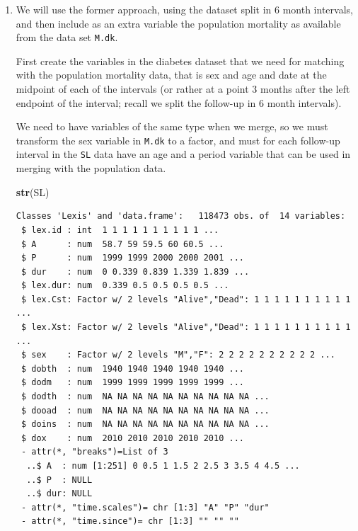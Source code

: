 \documentclass[
]{book}
\newenvironment{Shaded}{\begin{snugshade}}{\end{snugshade}}
\newcommand{\CommentTok}[1]{\textcolor[rgb]{0.56,0.35,0.01}{\textit{#1}}}
\newcommand{\FloatTok}[1]{\textcolor[rgb]{0.00,0.00,0.81}{#1}}
\newcommand{\FunctionTok}[1]{\textcolor[rgb]{0.13,0.29,0.53}{\textbf{#1}}}
\newcommand{\NormalTok}[1]{#1}
\newcommand{\OtherTok}[1]{\textcolor[rgb]{0.56,0.35,0.01}{#1}}
\newcommand{\SpecialCharTok}[1]{\textcolor[rgb]{0.81,0.36,0.00}{\textbf{#1}}}
\theoremstyle{definition}
\theoremstyle{definition}
\theoremstyle{definition}
\theoremstyle{definition}
\theoremstyle{remark}
\begin{document}
\begin{enumerate}
\def\labelenumi{\arabic{enumi}.}
\setcounter{enumi}{11}
\item
  We will use the former approach, using the dataset split in
  6 month intervals, and then include as an extra variable the
  population mortality as available from the data set \texttt{M.dk}.

  First create the variables in the diabetes dataset that we need
  for matching with the population mortality data, that is sex and
  age and date at the midpoint of each of the intervals (or rather at a
  point 3 months after the left endpoint of the interval; recall
  we split the follow-up in 6 month intervals).

  We need to have variables of the same type when we merge, so we must
  transform the sex variable in \texttt{M.dk} to a factor, and must
  for each follow-up interval in the \texttt{SL} data have an age and
  a period variable that can be used in merging with the population data.

\begin{Shaded}
\begin{Highlighting}[]
\FunctionTok{str}\NormalTok{(SL)}
\end{Highlighting}
\end{Shaded}

\begin{verbatim}
Classes 'Lexis' and 'data.frame':   118473 obs. of  14 variables:
 $ lex.id : int  1 1 1 1 1 1 1 1 1 1 ...
 $ A      : num  58.7 59 59.5 60 60.5 ...
 $ P      : num  1999 1999 2000 2000 2001 ...
 $ dur    : num  0 0.339 0.839 1.339 1.839 ...
 $ lex.dur: num  0.339 0.5 0.5 0.5 0.5 ...
 $ lex.Cst: Factor w/ 2 levels "Alive","Dead": 1 1 1 1 1 1 1 1 1 1 ...
 $ lex.Xst: Factor w/ 2 levels "Alive","Dead": 1 1 1 1 1 1 1 1 1 1 ...
 $ sex    : Factor w/ 2 levels "M","F": 2 2 2 2 2 2 2 2 2 2 ...
 $ dobth  : num  1940 1940 1940 1940 1940 ...
 $ dodm   : num  1999 1999 1999 1999 1999 ...
 $ dodth  : num  NA NA NA NA NA NA NA NA NA NA ...
 $ dooad  : num  NA NA NA NA NA NA NA NA NA NA ...
 $ doins  : num  NA NA NA NA NA NA NA NA NA NA ...
 $ dox    : num  2010 2010 2010 2010 2010 ...
 - attr(*, "breaks")=List of 3
  ..$ A  : num [1:251] 0 0.5 1 1.5 2 2.5 3 3.5 4 4.5 ...
  ..$ P  : NULL
  ..$ dur: NULL
 - attr(*, "time.scales")= chr [1:3] "A" "P" "dur"
 - attr(*, "time.since")= chr [1:3] "" "" ""
\end{verbatim}

\begin{Shaded}
\end{Shaded}


\end{enumerate}
\end{document}
